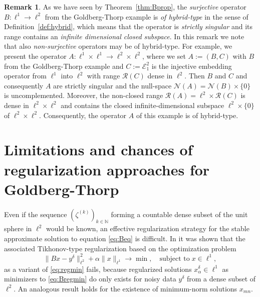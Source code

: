\documentclass[12pt,twoside,reqno]{amsart}
\theoremstyle{definition}
\newtheorem{remark}[theorem]{Remark}
\numberwithin{equation}{section}
\begin{document}
\begin{remark} \label{rem:nonsurjectivehybrid}
As we have seen by Theorem~\ref{thm:Bprop}, the \emph{surjective} operator $B: \ell^1 \to \ell^2$ from the Goldberg-Thorp example is \emph{of hybrid-type} in the sense of Definition~\ref{def:hybrid}, which means that the operator is \emph{strictly singular} and its range contains an \emph{infinite dimensional closed subspace}. In this remark we note that also \emph{non-surjective} operators may be of hybrid-type. For example, we present the operator $A:\ell^1\times\ell^1\to\ell^2\times\ell^2$, where we set $A:=(B,C)$ with $B$ from the Goldberg-Thorp example and
$C:=\mathcal{E}_1^2$ is the injective embedding operator from $\ell^1$ into $\ell^2$ with range $\mathcal{R}(C)$ dense in $\ell^2$. Then $B$ and $C$ and consequently $A$ are strictly singular and the null-space $\mathcal{N}(A)=\mathcal{N}(B) \times \{0\}$ is uncomplemented. Moreover, the non-closed range $\mathcal{R}(A)=\ell^2 \times \mathcal{R}(C)$ is dense in $\ell^2 \times \ell^2$ and contains the closed infinite-dimensional subspace
$\ell^2\times\{0\}$ of $\ell^2 \times \ell^2$. Consequently, the operator $A$ of this example is of hybrid-type.
\end{remark}

\section{Limitations and chances of regularization approaches for Goldberg-Thorp} \label{sec:regu}



Even if the sequence $(\zeta^{(k)})_{k\in\mathbb{N}}$ forming a countable dense subset of the unit sphere in $\ell^2$ would be known,
an effective regularization strategy for the stable approximate solution to equation \eqref{eq:Beq} is difficult.
In \cite[Theorem~3.3]{FleHof25} it was shown that the associated Tikhonov-type regularization based on the optimization problem
\begin{equation} \label{eq:Bregmin}
 \|Bx-y^\delta\|^2_{\ell^2}+\alpha \|x\|_{\ell^1} \to \min, \quad \mbox{subject to} \; x \in \ell^1,
\end{equation}
as a variant of \eqref{eq:regmin} fails, because regularized solutions $x_\alpha^\delta \in \ell^1$ as minimizers to \eqref{eq:Bregmin} do only exists for noisy data $y^\delta$
from a dense subset of $\ell^2$. An analogous result holds for the existence of minimum-norm solutions $x_{mn}$.

\smallskip
\end{document}
